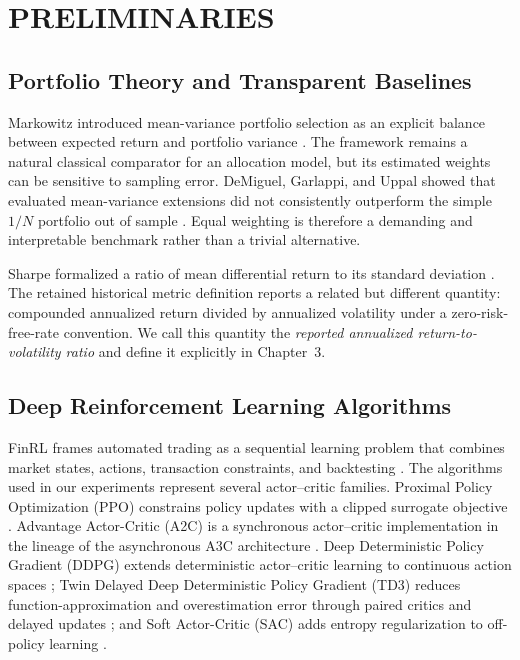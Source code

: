 \documentclass[12pt,a4paper,oneside]{book}
\theoremstyle{plain}
\numberwithin{equation}{chapter} \DeclareMathOperator{\Var}{Var}
\begin{document}
\FloatBarrier

\chapter{PRELIMINARIES}

\section{Portfolio Theory and Transparent Baselines}

Markowitz introduced mean-variance portfolio selection as an explicit balance between expected return and portfolio variance \cite{markowitz1952}. The framework remains a natural classical comparator for an allocation model, but its estimated weights can be sensitive to sampling error. DeMiguel, Garlappi, and Uppal showed that evaluated mean-variance extensions did not consistently outperform the simple $1/N$ portfolio out of sample \cite{demiguel2009naive}. Equal weighting is therefore a demanding and interpretable benchmark rather than a trivial alternative.

Sharpe formalized a ratio of mean differential return to its standard deviation \cite{sharpe1994}. The retained historical metric definition reports a related but different quantity: compounded annualized return divided by annualized volatility under a zero-risk-free-rate convention. We call this quantity the \emph{reported annualized return-to-volatility ratio} and define it explicitly in Chapter~3.

\section{Deep Reinforcement Learning Algorithms}

FinRL frames automated trading as a sequential learning problem that combines market states, actions, transaction constraints, and backtesting \cite{liu2020finrl}. The algorithms used in our experiments represent several actor--critic families. Proximal Policy Optimization (PPO) constrains policy updates with a clipped surrogate objective \cite{schulman2017ppo}. Advantage Actor-Critic (A2C) is a synchronous actor--critic implementation in the lineage of the asynchronous A3C architecture \cite{mnih2016a3c}. Deep Deterministic Policy Gradient (DDPG) extends deterministic actor--critic learning to continuous action spaces \cite{lillicrap2015ddpg}; Twin Delayed Deep Deterministic Policy Gradient (TD3) reduces function-approximation and overestimation error through paired critics and delayed updates \cite{fujimoto2018td3}; and Soft Actor-Critic (SAC) adds entropy regularization to off-policy learning \cite{haarnoja2018sac}.
\end{document}
